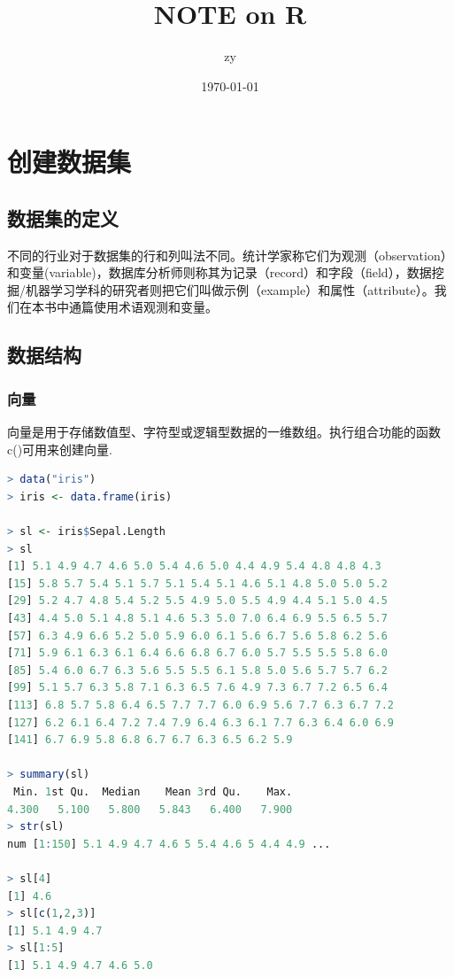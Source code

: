 \documentclass[11pt,a4paper,oneside]{book}
\title{\Huge NOTE on R}
\author{zy}
\date{\today}
\begin{document}
\maketitle
\tableofcontents  %
\chapter{创建数据集}
\section{数据集的定义}

不同的行业对于数据集的行和列叫法不同。统计学家称它们为观测（observation）和变量(variable)，数据库分析师则称其为记录（record）和字段（field），数据挖掘/机器学习学科的研究者则把它们叫做示例（example）和属性（attribute）。我们在本书中通篇使用术语观测和变量。

\section{数据结构}
\subsection{向量}

向量是用于存储数值型、字符型或逻辑型数据的一维数组。执行组合功能的函数c()可用来创建向量.

\begin{lstlisting}[language=R]
> data("iris")
> iris <- data.frame(iris)

> sl <- iris$Sepal.Length
> sl
[1] 5.1 4.9 4.7 4.6 5.0 5.4 4.6 5.0 4.4 4.9 5.4 4.8 4.8 4.3
[15] 5.8 5.7 5.4 5.1 5.7 5.1 5.4 5.1 4.6 5.1 4.8 5.0 5.0 5.2
[29] 5.2 4.7 4.8 5.4 5.2 5.5 4.9 5.0 5.5 4.9 4.4 5.1 5.0 4.5
[43] 4.4 5.0 5.1 4.8 5.1 4.6 5.3 5.0 7.0 6.4 6.9 5.5 6.5 5.7
[57] 6.3 4.9 6.6 5.2 5.0 5.9 6.0 6.1 5.6 6.7 5.6 5.8 6.2 5.6
[71] 5.9 6.1 6.3 6.1 6.4 6.6 6.8 6.7 6.0 5.7 5.5 5.5 5.8 6.0
[85] 5.4 6.0 6.7 6.3 5.6 5.5 5.5 6.1 5.8 5.0 5.6 5.7 5.7 6.2
[99] 5.1 5.7 6.3 5.8 7.1 6.3 6.5 7.6 4.9 7.3 6.7 7.2 6.5 6.4
[113] 6.8 5.7 5.8 6.4 6.5 7.7 7.7 6.0 6.9 5.6 7.7 6.3 6.7 7.2
[127] 6.2 6.1 6.4 7.2 7.4 7.9 6.4 6.3 6.1 7.7 6.3 6.4 6.0 6.9
[141] 6.7 6.9 5.8 6.8 6.7 6.7 6.3 6.5 6.2 5.9

> summary(sl)
 Min. 1st Qu.  Median    Mean 3rd Qu.    Max. 
4.300   5.100   5.800   5.843   6.400   7.900 
> str(sl)
num [1:150] 5.1 4.9 4.7 4.6 5 5.4 4.6 5 4.4 4.9 ...

> sl[4]
[1] 4.6
> sl[c(1,2,3)]
[1] 5.1 4.9 4.7
> sl[1:5]
[1] 5.1 4.9 4.7 4.6 5.0
\end{lstlisting}
\end{document}
